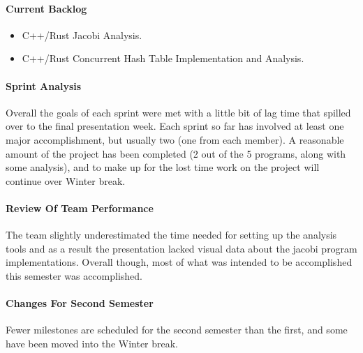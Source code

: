 \documentclass[10pt,a4paper]{report}
\begin{document}
\paragraph{Current Backlog}
\begin{flushleft}
	\begin{itemize}
		\item C++/Rust Jacobi Analysis.
		\item C++/Rust Concurrent Hash Table Implementation and Analysis.
	\end{itemize}
\end{flushleft}
\paragraph{Sprint Analysis}
Overall the goals of each sprint were met with a little bit of lag time that
spilled over to the final presentation week. Each sprint so far has involved at least one major accomplishment, but usually
two (one from each member). A reasonable amount of the project
has been completed (2 out of the 5 programs, along with some analysis), and to
make up for the lost time work on the project will continue over Winter break.
\paragraph{Review Of Team Performance}
The team slightly underestimated the time needed for setting up the analysis
tools and as a result the presentation lacked visual data about the jacobi
program implementations. Overall though, most of what was intended to be accomplished
this semester was accomplished.
\paragraph{Changes For Second Semester}
Fewer milestones are scheduled for the second semester than the first, and some have
been moved into the Winter break.
\end{document}
